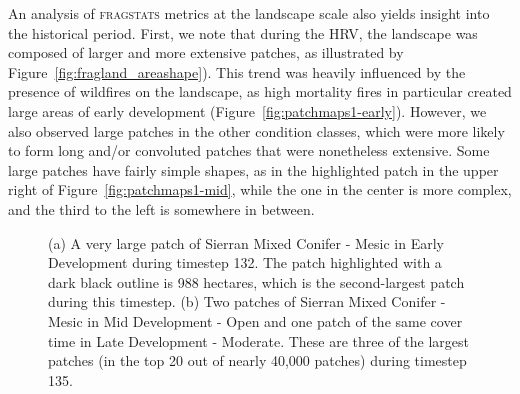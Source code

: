 An analysis of \textsc{fragstats} metrics at the landscape scale also yields insight into the historical period. First, we note that during the HRV, the landscape was composed of larger and more extensive patches, as illustrated by Figure~\ref{fig:fragland_areashape}). This trend was heavily influenced by the presence of wildfires on the landscape, as high mortality fires in particular created large areas of early development (Figure~\ref{fig:patchmaps1-early}). However, we also observed large patches in the other condition classes, which were more likely to form long and/or convoluted patches that were nonetheless extensive. Some large patches have fairly simple shapes, as in the highlighted patch in the upper right of Figure~\ref{fig:patchmaps1-mid}, while the one in the center is more complex, and the third to the left is somewhere in between.
\begin{figure}[!htbp]
  \centering
  \caption{(a) A very large patch of Sierran Mixed Conifer - Mesic in Early Development during timestep 132. The patch highlighted with a dark black outline is 988 hectares, which is the second-largest patch during this timestep. (b) Two patches of Sierran Mixed Conifer - Mesic in Mid Development - Open and one patch of the same cover time in Late Development - Moderate. These are three of the largest patches (in the top 20 out of nearly 40,000 patches) during timestep 135.} %
  \label{fig:patchmaps1}
\end{figure}

